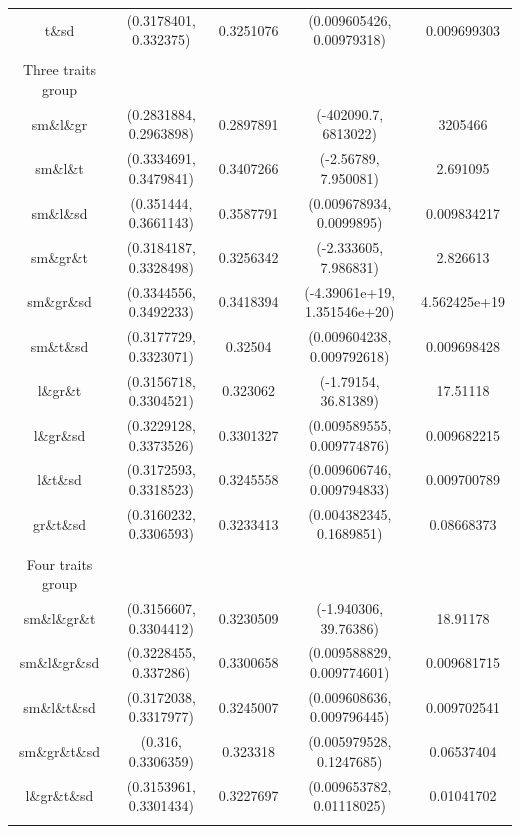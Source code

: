 \documentclass[a4paper, 11, margin=2cm]{article}
\begin{document}
\begin{table}[H]
\begin{center}
{{\begin{tabular}{||c c c c c||}
            t\&sd      & (0.3178401, 0.332375) & 0.3251076 & (0.009605426, 0.00979318) & 0.009699303 \\   
            \\
            Three traits group \\
            sm\&l\&gr    & (0.2831884, 0.2963898) & 0.2897891 & (-402090.7, 6813022) & 3205466 \\
            sm\&l\&t     & (0.3334691, 0.3479841) & 0.3407266 & (-2.56789, 7.950081) & 2.691095 \\
            sm\&l\&sd    & (0.351444, 0.3661143) & 0.3587791 & (0.009678934, 0.0099895) & 0.009834217 \\
            sm\&gr\&t    & (0.3184187, 0.3328498) & 0.3256342 & (-2.333605, 7.986831) & 2.826613 \\
            sm\&gr\&sd   & (0.3344556, 0.3492233) & 0.3418394 & (-4.39061e+19, 1.351546e+20) & 4.562425e+19 \\
            sm\&t\&sd    & (0.3177729, 0.3323071) & 0.32504 & (0.009604238, 0.009792618) & 0.009698428 \\
            l\&gr\&t     & (0.3156718, 0.3304521) & 0.323062 & (-1.79154, 36.81389) & 17.51118 \\
            l\&gr\&sd    & (0.3229128, 0.3373526) & 0.3301327 & (0.009589555, 0.009774876) & 0.009682215 \\
            l\&t\&sd     & (0.3172593, 0.3318523) & 0.3245558 & (0.009606746, 0.009794833) & 0.009700789 \\
            gr\&t\&sd       & (0.3160232, 0.3306593) & 0.3233413 & (0.004382345, 0.1689851) & 0.08668373 \\   
            \\     
            Four traits group \\
            sm\&l\&gr\&t  & (0.3156607, 0.3304412) & 0.3230509 & (-1.940306, 39.76386) & 18.91178 \\
            sm\&l\&gr\&sd & (0.3228455, 0.337286) & 0.3300658 & (0.009588829, 0.009774601) & 0.009681715 \\
            sm\&l\&t\&sd  & (0.3172038, 0.3317977) & 0.3245007 & (0.009608636, 0.009796445) & 0.009702541 \\
            sm\&gr\&t\&sd & (0.316, 0.3306359) & 0.323318 & (0.005979528, 0.1247685) & 0.06537404 \\
            l\&gr\&t\&sd  & (0.3153961, 0.3301434) & 0.3227697 & (0.009653782, 0.01118025) & 0.01041702 \\
            \\

\end{tabular}}}
\end{center}
\end{table}
\end{document}
